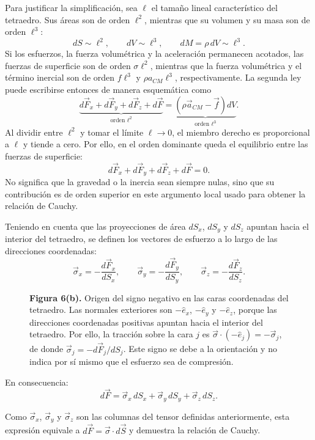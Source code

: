 Para justificar la simplificación, sea $\ell$ el tamaño lineal característico del tetraedro. Sus áreas son de orden $\ell^2$, mientras que su volumen y su masa son de orden $\ell^3$:
\[
dS\sim \ell^2,
\qquad
dV\sim \ell^3,
\qquad
dM=\rho\,dV\sim \ell^3.
\]
Si los esfuerzos, la fuerza volumétrica y la aceleración permanecen acotados, las fuerzas de superficie son de orden $\sigma\ell^2$, mientras que la fuerza volumétrica y el término inercial son de orden $f\ell^3$ y $\rho a_{CM}\ell^3$, respectivamente. La segunda ley puede escribirse entonces de manera esquemática como
\[
\underbrace{d\vec F_x+d\vec F_y+d\vec F_z+d\vec F}_{\text{orden }\ell^2}
=
\underbrace{(\rho\vec a_{CM}-\vec f)dV}_{\text{orden }\ell^3}.
\]
Al dividir entre $\ell^2$ y tomar el límite $\ell\to0$, el miembro derecho es proporcional a $\ell$ y tiende a cero. Por ello, en el orden dominante queda el equilibrio entre las fuerzas de superficie:
\[
d\vec F_x+d\vec F_y+d\vec F_z+d\vec F=0.
\]
No significa que la gravedad o la inercia sean siempre nulas, sino que su contribución es de orden superior en este argumento local usado para obtener la relación de Cauchy.

Teniendo en cuenta que las proyecciones de área $dS_x$, $dS_y$ y $dS_z$ apuntan hacia el interior del tetraedro, se definen los vectores de esfuerzo a lo largo de las direcciones coordenadas:
$$ \vec{\sigma}_x = -\frac{d\vec{F}_x}{dS_x}, \qquad \vec{\sigma}_y = -\frac{d\vec{F}_y}{dS_y}, \qquad \vec{\sigma}_z = -\frac{d\vec{F}_z}{dS_z}. $$

\begin{figure}[H]
\centering

\par\medskip
\textbf{Figura 6(b).} Origen del signo negativo en las caras coordenadas del tetraedro. Las normales exteriores son $-\hat e_x$, $-\hat e_y$ y $-\hat e_z$, porque las direcciones coordenadas positivas apuntan hacia el interior del tetraedro. Por ello, la tracción sobre la cara $j$ es $\vec\sigma\cdot(-\hat e_j)=-\vec\sigma_j$, de donde $\vec\sigma_j=-d\vec F_j/dS_j$. Este signo se debe a la orientación y no indica por sí mismo que el esfuerzo sea de compresión.
\end{figure}

En consecuencia:
$$ d\vec{F} = \vec{\sigma}_x\,dS_x + \vec{\sigma}_y\,dS_y + \vec{\sigma}_z\,dS_z. $$

Como $\vec\sigma_x$, $\vec\sigma_y$ y $\vec\sigma_z$ son las columnas del tensor definidas anteriormente, esta expresión equivale a $d\vec F=\vec\sigma\cdot d\vec S$ y demuestra la relación de Cauchy.

